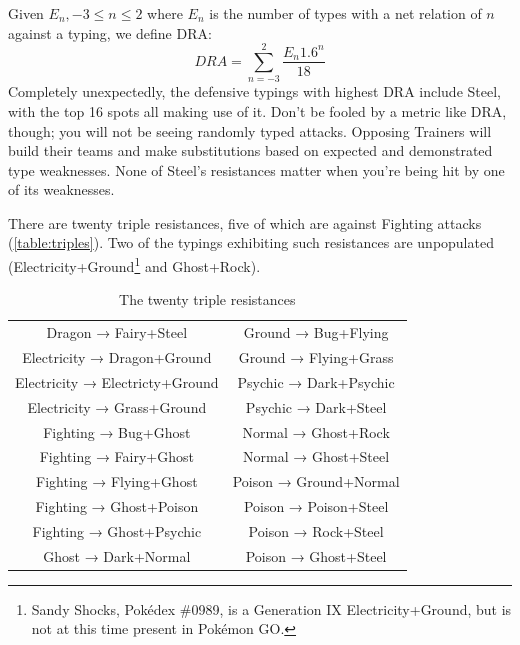 Given $E_{n}, -3 \le n \le 2$ where $E_n$ is the number of types with
  a net relation of $n$ against a typing, we define DRA\@:
\[  DRA = \sum_{n=-3}^{2} \frac{E_{n}1.6^n}{18} \]
Completely unexpectedly, the defensive typings with highest DRA include Steel,
  with the top 16 spots all making use of it.
Don't be fooled by a metric like DRA, though; you will not be seeing
  randomly typed attacks.
Opposing Trainers will build their teams and make substitutions based on
  expected and demonstrated type weaknesses.
None of Steel's resistances matter when you're being hit by one of its
  weaknesses.



There are twenty triple resistances, five of which are against Fighting attacks (\autoref{table:triples}).
Two of the typings exhibiting such resistances are unpopulated
  (Electricity+Ground\footnote{Sandy Shocks, Pokédex \#0989, is a Generation IX
  Electricity+Ground, but is not at this time present in Pokémon GO.} and Ghost+Rock).
\begin{table}[h]
  \begin{center}
    \begin{tabular}{cc}
Dragon → Fairy+Steel & Ground → Bug+Flying \\
Electricity → Dragon+Ground & Ground → Flying+Grass \\
Electricity → Electricty+Ground & Psychic → Dark+Psychic \\
Electricity → Grass+Ground & Psychic → Dark+Steel \\
Fighting → Bug+Ghost & Normal → Ghost+Rock \\
Fighting → Fairy+Ghost & Normal → Ghost+Steel \\
Fighting → Flying+Ghost & Poison → Ground+Normal \\
Fighting → Ghost+Poison & Poison → Poison+Steel \\
Fighting → Ghost+Psychic & Poison → Rock+Steel \\
Ghost → Dark+Normal & Poison → Ghost+Steel \\
    \end{tabular}
    \caption{The twenty triple resistances}
    \label{table:triples}
  \end{center}
\end{table}

